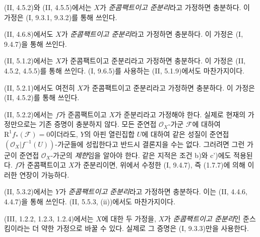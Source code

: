 \begin{env}[1.7.14]
\label{IV.1.7.14-fr}
(II, 4.5.2)와 (II, 4.5.5)에서는 $X$가 \emph{준콤팩트이고
준분리}라고 가정하면 충분하다. 이 가정은 (I, 9.3.1, 9.3.2)를 통해
쓰인다.
\end{env}

\begin{env}[1.7.15]
\label{IV.1.7.15-fr}
(II, 4.6.8)에서도 $X$가 \emph{준콤팩트이고 준분리}라고 가정하면
충분하다. 이 가정은 (I, 9.4.7)을 통해 쓰인다.
\end{env}

\begin{env}[1.7.16]
\label{IV.1.7.16-fr}
(II, 5.1.2)에서는 $X$가 준콤팩트이고 준분리라고 가정하면 충분하다.
이 가정은 (II, 4.5.2, 4.5.5)를 통해 쓰인다. (I, 9.6.5)를 사용하는
(II, 5.1.9)에서도 마찬가지이다.
\end{env}

\begin{env}[1.7.17]
\label{IV.1.7.17-fr}
(II, 5.2.1)에서도 여전히 $X$가 준콤팩트이고 준분리라고 가정하면
충분하다. 이 가정은 (II, 4.5.2)를 통해 쓰인다.
\end{env}

\begin{env}[1.7.18]
\label{IV.1.7.18-fr}
(II, 5.2.2)에서는 $f$가 준콤팩트이고 $X$가 준분리라고 가정해야
한다. 실제로 현재의 가정만으로는 기존 증명이 충분하지 않다. 모든
준연접 $\mathcal O_X$-가군 $\mathcal F$에 대하여
$\mathrm R^1f_*(\mathcal F)=0$이더라도, $Y$의 아핀 열린집합 $U$에
대하여 같은 성질이 준연접 $(\mathcal O_X|f^{-1}(U))$-가군들에
성립한다고 반드시 결론지을 수는 없다. 그러려면 그런 가군이 준연접
$\mathcal O_X$-가군의 \emph{제한}임을 알아야 한다. 같은 지적은 조건
b)와 c')에도 적용된다. $f$가 준콤팩트이고 $X$가 준분리이면, 위에서
수정한 (I, 9.4.7), 즉 (1.7.7)에 의해 이러한 연장이 가능하다.
\end{env}

\begin{env}[1.7.19]
\label{IV.1.7.19-fr}
(II, 5.3.2)에서는 $Y$가 \emph{준콤팩트이고 준분리}라고 가정하면
충분하다. 이는 (II, 4.4.6, 4.4.7)을 통해 쓰인다. (II, 5.5.3,
(ii))에서도 마찬가지이다.
\end{env}

\begin{env}[1.7.20]
\label{IV.1.7.20-fr}
(III, 1.2.2, 1.2.3, 1.2.4)에서는 $X$에 대한 두 가정을, $X$가
\emph{준콤팩트이고 준분리}인 준스킴이라는 더 약한 가정으로 바꿀
수 있다. 실제로 그 증명은 (I, 9.3.3)만을 사용한다.
\end{env}

